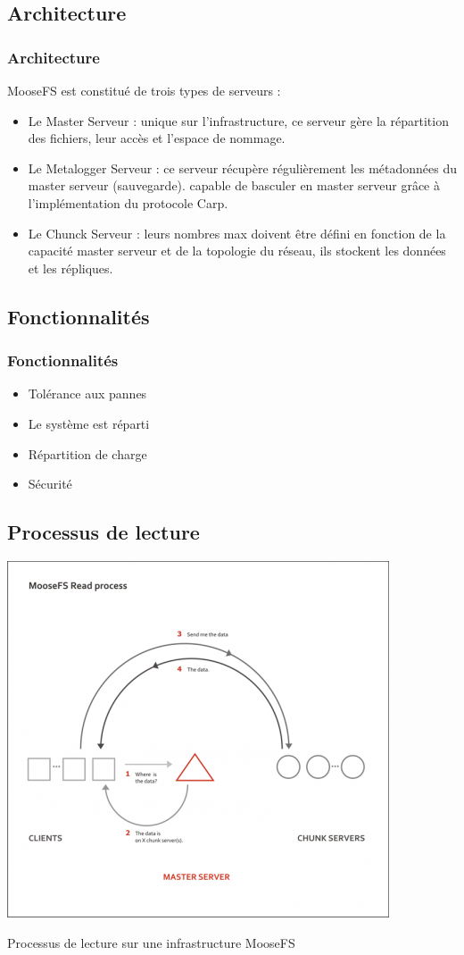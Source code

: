 \documentclass[blue]{beamer}
\begin{document}
\subsection{Architecture}
\begin{frame}
\frametitle{Architecture}
MooseFS est constitué de trois types de serveurs :
\begin{itemize}
			\item Le Master Serveur : unique sur l'infrastructure, ce serveur gère la répartition des fichiers, leur accès et l'espace de nommage.
			\item Le Metalogger Serveur : ce serveur récupère régulièrement les métadonnées du master serveur (sauvegarde). capable de basculer en master serveur grâce à l'implémentation du protocole Carp.
			\item Le Chunck Serveur : leurs nombres max doivent être défini en fonction de la capacité master serveur et de la topologie du réseau, ils stockent les données et les répliques.
		\end{itemize}
\end{frame}

\subsection{Fonctionnalités}
\begin{frame}
\frametitle{Fonctionnalités}
\begin{itemize}
\item Tolérance aux pannes 
\item Le système est réparti
\item Répartition de charge
\item Sécurité
\end{itemize}
\end{frame}

\subsection{Processus de lecture}
\begin{frame}
\begin{center}
\includegraphics[width=0.6\linewidth]{../images/masterread.png}
\end{center}
Processus de lecture sur une infrastructure MooseFS
\end{frame}
\end{document}
